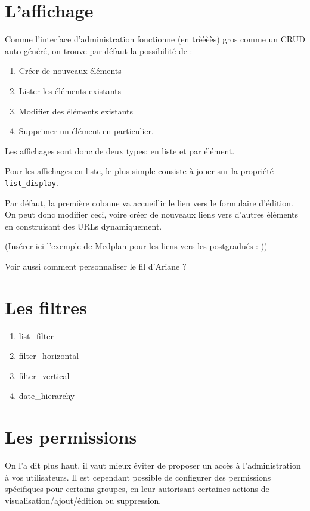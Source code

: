 \documentclass[11pt]{amsbook}
\begin{document}
\hypertarget{x-l’affichage}{\section{L’affichage}}
Comme l’interface d’administration fonctionne (en trèèèès) gros comme un CRUD auto-généré, on trouve par défaut la possibilité de :


\begin{enumerate}

\item{Créer de nouveaux éléments}

\item{Lister les éléments existants}

\item{Modifier des éléments existants}

\item{Supprimer un élément en particulier.}

\end{enumerate}


Les affichages sont donc de deux types: en liste et par élément.


Pour les affichages en liste, le plus simple consiste à jouer sur la propriété \texttt{list\_display}.


Par défaut, la première colonne va accueillir le lien vers le formulaire d’édition.
On peut donc modifier ceci, voire créer de nouveaux liens vers d’autres éléments en construisant des URLs dynamiquement.


(Insérer ici l’exemple de Medplan pour les liens vers les postgradués :-))


Voir aussi comment personnaliser le fil d’Ariane ?


\hypertarget{x-les-filtres}{\section{Les filtres}}
\begin{enumerate}

\item{list\_filter}

\item{filter\_horizontal}

\item{filter\_vertical}

\item{date\_hierarchy}

\end{enumerate}


\hypertarget{x-les-permissions}{\section{Les permissions}}
On l’a dit plus haut, il vaut mieux éviter de proposer un accès à l’administration à vos utilisateurs.
Il est cependant possible de configurer des permissions spécifiques pour certains groupes, en leur autorisant certaines actions de visualisation/ajout/édition ou suppression.
\end{document}
